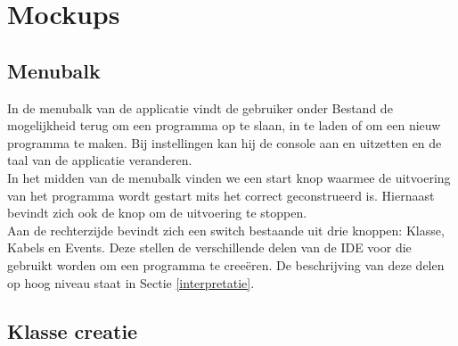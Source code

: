 \documentclass[]{article}
\begin{document}
\section{Mockups}
\label{Mockups}
\subsection{Menubalk}
In de menubalk van de applicatie vindt de gebruiker onder Bestand de mogelijkheid terug om een programma op te slaan, in te laden of om een nieuw programma te maken. Bij instellingen kan hij de console aan en uitzetten en de taal van de applicatie veranderen.\\In het midden van de menubalk vinden we een start knop waarmee de uitvoering van het programma wordt gestart mits het correct geconstrueerd is. Hiernaast bevindt zich ook de knop om de uitvoering te stoppen.\\ Aan de rechterzijde bevindt zich een switch bestaande uit drie knoppen: Klasse, Kabels en Events. Deze stellen de verschillende delen van de IDE voor die gebruikt worden om een programma te cree\"{e}ren. De beschrijving van deze delen op hoog niveau staat in Sectie \ref{interpretatie}.
\subsection{Klasse creatie}
\end{document}
